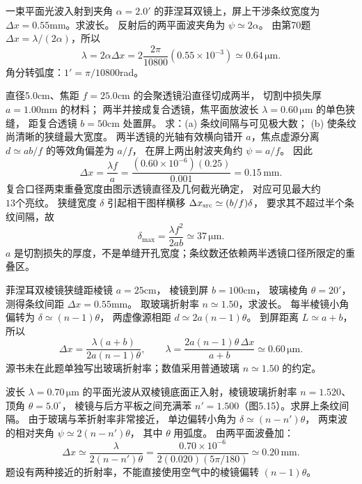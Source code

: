 一束平面光波入射到夹角 $\alpha=2.0'$ 的菲涅耳双镜上，屏上干涉条纹宽度为
$\Delta x=0.55$mm。求波长。
\exsolution
反射后的两平面波夹角为
$\psi\simeq2\alpha$。
由第70题
$\Delta x=\lambda/(2\alpha)$，所以
\[
\boxed{\lambda=2\alpha\Delta x
=2\frac{2\pi}{10800}(0.55\times10^{-3})
\simeq0.64\,\mathrm{\mu m}}.
\]
\excheck 角分转弧度：$1'=\pi/10800$rad。

直径5.0cm、焦距
$f=25.0$cm 的会聚透镜沿直径切成两半，
切割中损失厚 $a=1.00$mm 的材料；
两半并接成复合透镜，焦平面放波长
$\lambda=0.60\,\mathrm{\mu m}$ 的单色狭缝，
距复合透镜 $b=50$cm 处置屏。
求：(a) 条纹间隔与可见极大数；
(b) 使条纹尚清晰的狭缝最大宽度。
\exsolution
两半透镜的光轴有效横向错开 $a$，焦点虚源分离
$d\simeq ab/f$ 的等效角偏差为 $a/f$，
在屏上两出射波夹角约 $\psi=a/f$。
因此
\[
\boxed{\Delta x=\frac{\lambda f}{a}
=\frac{(0.60\times10^{-6})(0.25)}{0.001}
=0.15\,\mathrm{mm}}.
\]
复合口径两束重叠宽度由图示透镜直径及几何截光确定，
对应可见最大约
$\boxed{13\text{个亮纹}}$。
狭缝宽度 $\delta$ 引起相干图样横移
$\Delta x_{\rm src}\simeq(b/f)\delta$，
要求其不超过半个条纹间隔，故
\[
\boxed{\delta_{\max}=\frac{\lambda f^2}{2ab}
\simeq37\,\mathrm{\mu m}}.
\]
\excheck $a$ 是切割损失的厚度，不是单缝开孔宽度；条纹数还依赖两半透镜口径所限定的重叠区。

菲涅耳双棱镜狭缝距棱镜 $a=25$cm，
棱镜到屏 $b=100$cm，
玻璃棱角 $\theta=20'$，测得条纹间距
$\Delta x=0.55$mm。
取玻璃折射率 $n\simeq1.50$，求波长。
\exsolution
每半棱镜小角偏转为
$\delta\simeq(n-1)\theta$，
两虚像源相距
$d\simeq2a(n-1)\theta$。
到屏距离 $L\simeq a+b$，
所以
\[
\Delta x=\frac{\lambda(a+b)}{2a(n-1)\theta},
\qquad
\boxed{\lambda=
\frac{2a(n-1)\theta\,\Delta x}{a+b}
\simeq0.60\,\mathrm{\mu m}}.
\]
\excheck 源书未在此题单独写出玻璃折射率；数值采用普通玻璃 $n\simeq1.50$ 的约定。

波长 $\lambda=0.70\,\mathrm{\mu m}$ 的平面光波从双棱镜底面正入射，棱镜玻璃折射率
$n=1.520$、顶角 $\theta=5.0^\circ$，
棱镜与后方平板之间充满苯
$n'=1.500$（图5.15）。求屏上条纹间隔。
\exsolution
由于玻璃与苯折射率非常接近，
单边偏转小角为
$\delta\simeq(n-n')\theta$，
两束波的相对夹角
$\psi\simeq2(n-n')\theta$，
其中 $\theta$ 用弧度。
由两平面波叠加：
\[
\boxed{\Delta x\simeq
\frac{\lambda}{2(n-n')\theta}
=\frac{0.70\times10^{-6}}
{2(0.020)(5\pi/180)}
\simeq0.20\,\mathrm{mm}}.
\]
\excheck 题设有两种接近的折射率，不能直接使用空气中的棱镜偏转 $(n-1)\theta$。
